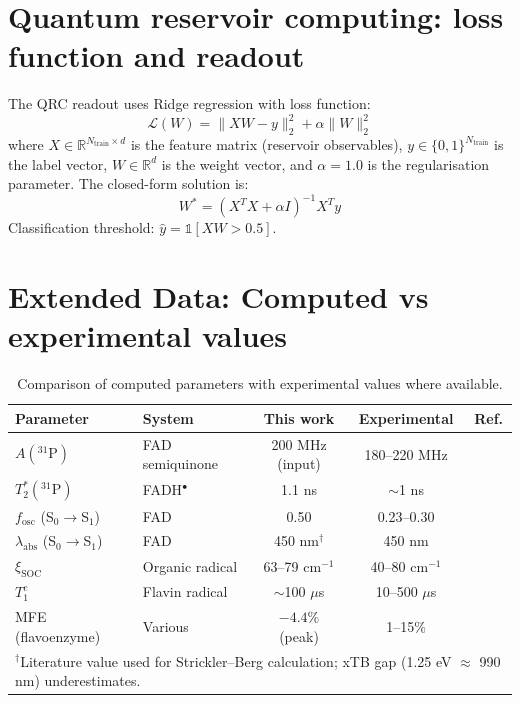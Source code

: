 \section{Quantum reservoir computing: loss function and readout}

The QRC readout uses Ridge regression with loss function:
\begin{equation}
\mathcal{L}(W) = \|XW - y\|_2^2 + \alpha\|W\|_2^2
\label{eq:ridge}
\end{equation}
where $X \in \mathbb{R}^{N_\mathrm{train} \times d}$ is the feature matrix (reservoir observables), $y \in \{0,1\}^{N_\mathrm{train}}$ is the label vector, $W \in \mathbb{R}^d$ is the weight vector, and $\alpha = 1.0$ is the regularisation parameter. The closed-form solution is:
\begin{equation}
W^* = (X^T X + \alpha I)^{-1} X^T y
\end{equation}
Classification threshold: $\hat{y} = \mathbb{1}[XW > 0.5]$.

\section{Extended Data: Computed vs experimental values}

\begin{table}[htbp]
\centering
\caption{Comparison of computed parameters with experimental values where available.}
\label{tab:validation}
\small
\begin{tabular}{@{}llccc@{}}
\toprule
Parameter & System & This work & Experimental & Ref. \\
\midrule
$A(^{31}\mathrm{P})$ & FAD semiquinone & 200 MHz (input) & 180--220 MHz & \cite{Weber1998} \\
$T_2^*(^{31}\mathrm{P})$ & FADH$^\bullet$ & 1.1 ns & $\sim$1 ns & \cite{Weber1998} \\
$f_\mathrm{osc}$ (S$_0\to$S$_1$) & FAD & 0.50 & 0.23--0.30 & \cite{Islam2003} \\
$\lambda_\mathrm{abs}$ (S$_0\to$S$_1$) & FAD & 450 nm$^\dagger$ & 450 nm & \cite{Islam2003} \\
$\xi_\mathrm{SOC}$ & Organic radical & 63--79 cm$^{-1}$ & 40--80 cm$^{-1}$ & \cite{Marian2012} \\
$T_1^e$ & Flavin radical & $\sim$100 $\mu$s & 10--500 $\mu$s & \cite{Weber1998} \\
MFE (flavoenzyme) & Various & $-4.4\%$ (peak) & 1--15\% & \cite{Maeda2012} \\
\bottomrule
\multicolumn{5}{l}{\footnotesize $^\dagger$Literature value used for Strickler--Berg calculation; xTB gap (1.25 eV $\approx$ 990 nm) underestimates.}
\end{tabular}
\end{table}

